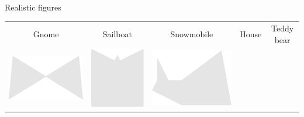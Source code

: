 \documentclass[14pt]{beamer}
\begin{document}
\begin{frame}{Realistic figures}
\begin{center}
{\begin{tabular}{ccccc}
                Gnome & Sailboat & Snowmobile & House & Teddy bear\\[2ex]
                \includegraphics[scale=0.21]{figures/figure026r.pdf} &
                \includegraphics[scale=0.21]{figures/figure026p.pdf} &
                \includegraphics[scale=0.21]{figures/figure026ac.pdf} &

\end{tabular}}
\end{center}
\end{frame}
\end{document}
